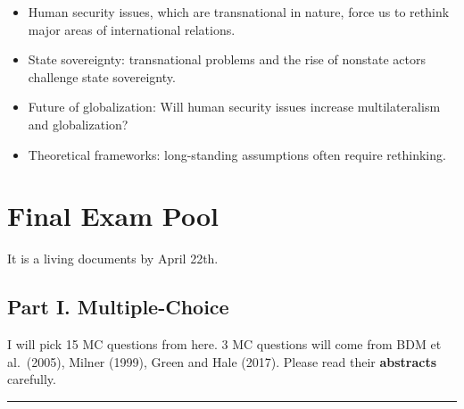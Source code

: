 \documentclass[
]{book}
\begin{document}
\begin{itemize}
\item
  Human security issues, which are transnational in nature, force us to rethink major areas of international relations.
\item
  State sovereignty: transnational problems and the rise of nonstate actors challenge state sovereignty.
\item
  Future of globalization: Will human security issues increase multilateralism and globalization?
\item
  Theoretical frameworks: long-standing assumptions often require rethinking.
\end{itemize}

\hypertarget{final-exam-pool}{%
\chapter*{Final Exam Pool}\label{final-exam-pool}}

It is a living documents by April 22th.

\hypertarget{part-i.-multiple-choice}{%
\section*{Part I. Multiple-Choice}\label{part-i.-multiple-choice}}

I will pick 15 MC questions from here. 3 MC questions will come from BDM et al.~(2005), Milner (1999), Green and Hale (2017). Please read their \textbf{abstracts} carefully.

\begin{center}\rule{0.5\linewidth}{0.5pt}\end{center}
\end{document}
